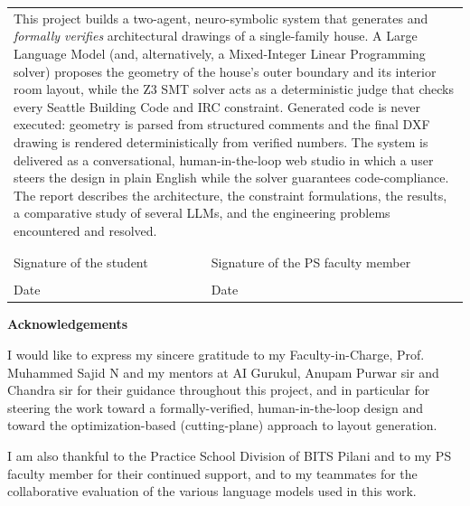 \documentclass{book}
\begin{document}
{\begin{tabular}{p{6cm}l}
		\multicolumn{2}{p{14cm}}{This project builds a two-agent, neuro-symbolic system that generates and \emph{formally verifies} architectural drawings of a single-family house. A Large Language Model (and, alternatively, a Mixed-Integer Linear Programming solver) proposes the geometry of the house's outer boundary and its interior room layout, while the Z3 SMT solver acts as a deterministic judge that checks every Seattle Building Code and IRC constraint. Generated code is never executed: geometry is parsed from structured comments and the final DXF drawing is rendered deterministically from verified numbers. The system is delivered as a conversational, human-in-the-loop web studio in which a user steers the design in plain English while the solver guarantees code-compliance. The report describes the architecture, the constraint formulations, the results, a comparative study of several LLMs, and the engineering problems encountered and resolved.} \\
		& \\ & \\
		Signature of the student & \hspace*{1cm}Signature of the PS faculty member \\
		& \\
		Date & \hspace*{1cm}Date \\
	\end{tabular}}
\newpage

\centerline{\bf \Large Acknowledgements}
\vspace*{0.5cm}
\par\noindent I would like to express my sincere gratitude to my Faculty-in-Charge, Prof. Muhammed Sajid N and my mentors at AI Gurukul, Anupam Purwar sir and Chandra sir for their guidance throughout this project, and in particular for steering the work toward a formally-verified, human-in-the-loop design and toward the optimization-based (cutting-plane) approach to layout generation. %

\par\noindent I am also thankful to the Practice School Division of BITS Pilani and to my PS faculty member for their continued support, and to my teammates for the collaborative evaluation of the various language models used in this work.

\vfill
\par{}
\end{document}
